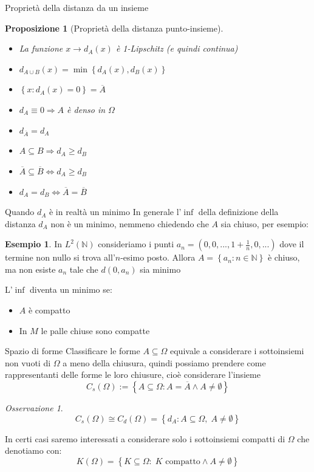 \documentclass{beamer}
\newcounter{counter1}
\theoremstyle{plain}
\newtheorem{mypro}[counter1]{Proposizione}
\theoremstyle{definition}
\newtheorem{myes}[counter1]{Esempio}
\theoremstyle{remark}
\newtheorem{myoss}[counter1]{Osservazione}
\newcommand{\obar}[1]{\overline{#1}}
\newcommand{\set}[1]{\left\{#1\right\}}
\begin{document}
\begin{frame}{Proprietà della distanza da un insieme}
  \begin{mypro}[Proprietà della distanza punto-insieme]
    \begin{itemize}
    \item La funzione $x \rightarrow d_A(x)$ è 1-Lipschitz (e quindi
      continua)
    \item $d_{A\cup B}(x) = \min\set{d_A(x),d_B(x)}$
    \item $\set{x:d_A(x) = 0} = \obar A$
    \item $d_A \equiv 0 \Rightarrow A$ è denso in $\Omega$
    \item $d_{\obar A} = d_A$
    \item $A\subseteq B \Rightarrow d_A \ge d_B$
    \item $\obar{ A} \subseteq \obar B \Leftrightarrow d_A \ge d_B$
    \item $d_A = d_B \Leftrightarrow \obar A = \obar B$
    \end{itemize}
  \end{mypro}
\end{frame}

\begin{frame}{Quando $d_A$ \`e in realt\`a un minimo}
  In generale l'$\inf$ della definizione della distanza $d_A$ non \`e
  un minimo, nemmeno chiedendo che $A$ sia chiuso, per esempio:
  \begin{myes}
    In $L^2(\mathbb{N})$ consideriamo i punti $a_n = ( 0, 0, ..., 1 +
    \frac{1}{n} , 0, ...)$ dove il termine non nullo si trova
    all'$n$-esimo posto. Allora $A = \set{ a_n : n\in \mathbb{N}}$ \`e
    chiuso, ma non esiste $a_n$ tale che $d(0,a_n)$ sia minimo
  \end{myes}

  L'$\inf$ diventa un minimo se:
  \begin{itemize}
  \item $A$ \`e compatto
  \item In $M$ le palle chiuse sono compatte
  \end{itemize}
\end{frame}

\begin{frame}{Spazio di forme}
  Classificare le forme $A \subseteq \Omega$ equivale a considerare i
  sottoinsiemi non vuoti di $\Omega$ a meno della chiusura, quindi
  possiamo prendere come rappresentanti delle forme le loro chiusure,
  cioè considerare l'insieme
  \[ C_s(\Omega) := \set{ A \subseteq \Omega : A = \obar A \wedge A
    \neq \emptyset } \]

  \begin{myoss}
    \[ C_s(\Omega) \cong C_d(\Omega) = \set{d_A : A \subseteq \Omega,\;
      A \neq \emptyset} \]
  \end{myoss}
  \vfill
  In certi casi saremo interessati a considerare solo i sottoinsiemi
  compatti di $\Omega$ che denotiamo con:
  \[ K(\Omega) = \set{K\subseteq \Omega :\; K \text{ compatto} \wedge
    A \neq \emptyset} \]
\end{frame}
\end{document}
